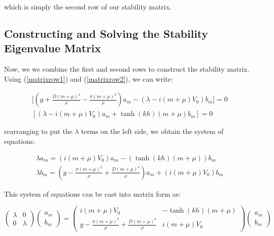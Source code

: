 \documentclass{article}
\begin{document}
\vspace{15} 

which is simply the second row of our stability matrix.

\subsection{Constructing and Solving the Stability Eigenvalue Matrix}

Now, we we combine the first and second rows to construct the stability matrix. Using (\ref{matrixrow1}) and (\ref{matrixrow2}), we can write: 


\begin{align} \label{matrix}
  \bigg[(g + \frac{D(m+\mu)^4}{\rho} - \frac{\sigma  (m+\mu)^2}{\rho})a_{m} - (\lambda - i(m+\mu)V_{0})b_{m}\bigg] = 0 
  \\
  [(\lambda - i(m+\mu)V_{0})a_{m} + \tanh(kh)(m+\mu)b_{m} ] = 0 
\end{align}

rearranging to put the \( \lambda \) terms on the left side, we obtain the system of equations:



\begin{align} \label{matrix2}
  \lambda a_{m} =  (i(m+\mu)V_{0})a_{m} - (\tanh(kh)(m+\mu))b_{m} 
  \\
  \lambda b_{m} =  (g - \frac{\sigma(m+\mu)^2}{\rho} + \frac{D(m+\mu)^4}{\rho})a_m + (i(m+\mu)V_{0})b_{m} 
\end{align}

This system of equations can be cast into matrix form as: 

\begin{equation}
    \begin{pmatrix} \label{stabilitymatrix}
    \lambda & 0\\
    0 & \lambda 
    \end{pmatrix}\begin{pmatrix} a_m \\ b_m \end{pmatrix}
    = 
    \begin{pmatrix} \label{stabilitymatrix}
    i(m+\mu)V_{0} & -\tanh(kh)(m+\mu)\\
    g - \frac{\sigma(m+\mu)^2}{\rho} + \frac{D(m+\mu)^4}{\rho} & i(m+\mu)V_{0} 
    \end{pmatrix}\begin{pmatrix} a_m \\ b_m \end{pmatrix}
\end{equation}
\end{document}
